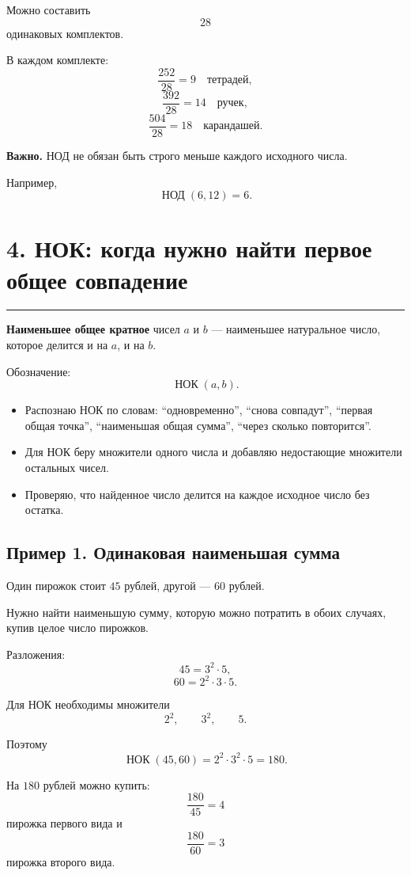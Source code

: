 \documentclass[a4paper,12pt]{article}
\newcommand{\sectionline}{%
    \par\vspace{2mm}
    {\color{accent}\rule{\linewidth}{0.7pt}}
    \vspace{2mm}
}
\newcommand{\checkitem}[1]{%
    \item[\textcolor{accent}{$\square$}] #1
}
\begin{document}
Можно составить
\[
    \boxed{28}
\]
одинаковых комплектов.

В каждом комплекте:
\[
    \frac{252}{28}=9
    \quad\text{тетрадей},
\]
\[
    \frac{392}{28}=14
    \quad\text{ручек},
\]
\[
    \frac{504}{28}=18
    \quad\text{карандашей}.
\]

\textbf{Важно.}
НОД не обязан быть строго меньше каждого исходного числа.

Например,
\[
    \operatorname{НОД}(6,12)=6.
\]

\section*{\color{darkaccent}4. НОК: когда нужно найти первое общее совпадение}
\sectionline

\textbf{Наименьшее общее кратное} чисел \(a\) и \(b\) --- наименьшее натуральное число, которое делится и на \(a\), и на \(b\).

Обозначение:
\[
    \operatorname{НОК}(a,b).
\]

\begin{itemize}
    \checkitem{Распознаю НОК по словам: ``одновременно'', ``снова совпадут'', ``первая общая точка'', ``наименьшая общая сумма'', ``через сколько повторится''.}

    \checkitem{Для НОК беру множители одного числа и добавляю недостающие множители остальных чисел.}

    \checkitem{Проверяю, что найденное число делится на каждое исходное число без остатка.}
\end{itemize}

\subsection*{Пример 1. Одинаковая наименьшая сумма}

Один пирожок стоит \(45\) рублей, другой --- \(60\) рублей.

Нужно найти наименьшую сумму, которую можно потратить в обоих случаях, купив целое число пирожков.

Разложения:
\[
    45=3^2\cdot5,
\]
\[
    60=2^2\cdot3\cdot5.
\]

Для НОК необходимы множители
\[
    2^2,\qquad 3^2,\qquad 5.
\]

Поэтому
\[
    \operatorname{НОК}(45,60)
    =
    2^2\cdot3^2\cdot5
    =
    180.
\]

На \(180\) рублей можно купить:
\[
    \frac{180}{45}=4
\]
пирожка первого вида и
\[
    \frac{180}{60}=3
\]
пирожка второго вида.
\end{document}
